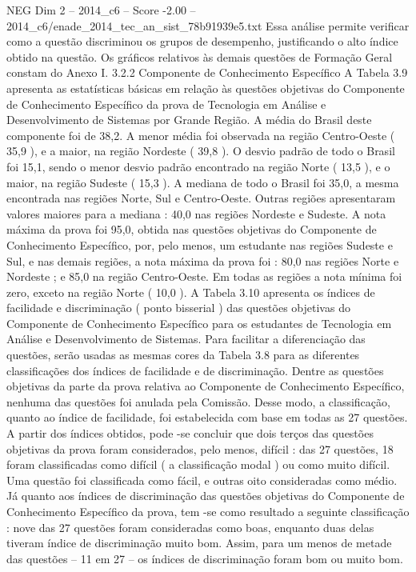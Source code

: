 \begin{textsample}{NEG Dim 2 – 2014\_c6 – Score -2.00 – 2014\_c6/enade\_2014\_tec\_an\_sist\_78b91939e5.txt}
Essa análise permite verificar como a questão discriminou os grupos de desempenho, justificando o alto índice obtido na questão.
Os gráficos relativos às demais questões de Formação Geral constam do Anexo I. 3.2.2 Componente de Conhecimento Específico A Tabela 3.9 apresenta as estatísticas básicas em relação às questões objetivas do Componente de Conhecimento Específico da prova de Tecnologia em Análise e Desenvolvimento de Sistemas por Grande Região.
A média do Brasil deste componente foi de 38,2.
A menor média foi observada na região Centro-Oeste ( 35,9 ), e a maior, na região Nordeste ( 39,8 ).
O desvio padrão de todo o Brasil foi 15,1, sendo o menor desvio padrão encontrado na região Norte ( 13,5 ), e o maior, na região Sudeste ( 15,3 ).
A mediana de todo o Brasil foi 35,0, a mesma encontrada nas regiões Norte, Sul e Centro-Oeste.
Outras regiões apresentaram valores maiores para a mediana : 40,0 nas regiões Nordeste e Sudeste.
A nota máxima da prova foi 95,0, obtida nas questões objetivas do Componente de Conhecimento Específico, por, pelo menos, um estudante nas regiões Sudeste e Sul, e nas demais regiões, a nota máxima da prova foi : 80,0 nas regiões Norte e Nordeste ; e 85,0 na região Centro-Oeste.
Em todas as regiões a nota mínima foi zero, exceto na região Norte ( 10,0 ).
A Tabela 3.10 apresenta os índices de facilidade e discriminação ( ponto bisserial ) das questões objetivas do Componente de Conhecimento Específico para os estudantes de Tecnologia em Análise e Desenvolvimento de Sistemas.
Para facilitar a diferenciação das questões, serão usadas as mesmas cores da Tabela 3.8 para as diferentes classificações dos índices de facilidade e de discriminação.
Dentre as questões objetivas da parte da prova relativa ao Componente de Conhecimento Específico, nenhuma das questões foi anulada pela Comissão.
Desse modo, a classificação, quanto ao índice de facilidade, foi estabelecida com base em todas as 27 questões.
A partir dos índices obtidos, pode -se concluir que dois terços das questões objetivas da prova foram considerados, pelo menos, difícil : das 27 questões, 18 foram classificadas como difícil ( a classificação modal ) ou como muito difícil.
Uma questão foi classificada como fácil, e outras oito consideradas como médio.
Já quanto aos índices de discriminação das questões objetivas do Componente de Conhecimento Específico da prova, tem -se como resultado a seguinte classificação : nove das 27 questões foram consideradas como boas, enquanto duas delas tiveram índice de discriminação muito bom.
Assim, para um menos de metade das questões – 11 em 27 – os índices de discriminação foram bom ou muito bom.

\end{textsample}
